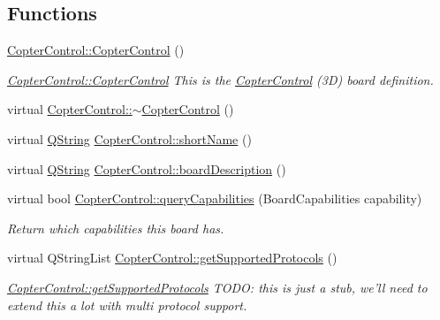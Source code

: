 \subsection*{Functions}
\begin{DoxyCompactItemize}
\item 
\hyperlink{group___boards___open_pilot_plugin_gadbec7022641a51cd87f98ca7dc734dcf}{Copter\-Control\-::\-Copter\-Control} ()
\begin{DoxyCompactList}\small\item\em \hyperlink{group___boards___open_pilot_plugin_gadbec7022641a51cd87f98ca7dc734dcf}{Copter\-Control\-::\-Copter\-Control} This is the \hyperlink{class_copter_control}{Copter\-Control} (3\-D) board definition. \end{DoxyCompactList}\item 
virtual \hyperlink{group___boards___open_pilot_plugin_ga42d298de6b0fb7cc74d9206f1cf18d40}{Copter\-Control\-::$\sim$\-Copter\-Control} ()
\item 
virtual \hyperlink{group___u_a_v_objects_plugin_gab9d252f49c333c94a72f97ce3105a32d}{Q\-String} \hyperlink{group___boards___open_pilot_plugin_ga0d1055d64f286350d10a89536e595046}{Copter\-Control\-::short\-Name} ()
\item 
virtual \hyperlink{group___u_a_v_objects_plugin_gab9d252f49c333c94a72f97ce3105a32d}{Q\-String} \hyperlink{group___boards___open_pilot_plugin_ga68dacf81a6b453c748b0403fa459a1e4}{Copter\-Control\-::board\-Description} ()
\item 
virtual bool \hyperlink{group___boards___open_pilot_plugin_ga5717283400c4b93b0c580a2af504a5d2}{Copter\-Control\-::query\-Capabilities} (Board\-Capabilities capability)
\begin{DoxyCompactList}\small\item\em Return which capabilities this board has. \end{DoxyCompactList}\item 
virtual Q\-String\-List \hyperlink{group___boards___open_pilot_plugin_ga5cf6a3278133728b41ab54897e6e8ef0}{Copter\-Control\-::get\-Supported\-Protocols} ()
\begin{DoxyCompactList}\small\item\em \hyperlink{group___boards___open_pilot_plugin_ga5cf6a3278133728b41ab54897e6e8ef0}{Copter\-Control\-::get\-Supported\-Protocols} T\-O\-D\-O\-: this is just a stub, we'll need to extend this a lot with multi protocol support. \end{DoxyCompactList}\item 

\end{DoxyCompactItemize}
